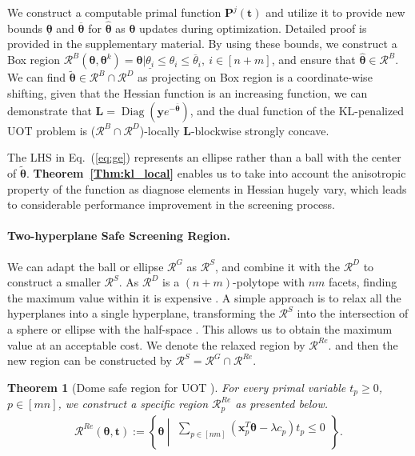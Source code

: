 \documentclass[11pt]{article}
\newtheorem{thm}{Theorem}
\newcommand{\diag}{\operatorname{Diag}}
\newcommand{\mat}[1]{\mathbf{#1}}
\renewcommand{\vec}[1]{\bm{#1}}
\begin{document}
We construct a computable primal function $\mat P^{j}({\vec t})$ and utilize it to provide new bounds $\underline{\vec\theta}$ and $\overline{\vec\theta}$ for $\hat{\vec\theta}$ as $\vec\theta$ updates during optimization. Detailed proof is provided in the supplementary material. By using these bounds, we construct a Box region $\mathcal{R}^{B}(\vec\theta,\vec\theta^{k}) = {\vec\theta | \underline{\theta_i} \leq {\theta}_i \leq \overline{\theta}_i, \ i \in [n+m] }$, and ensure that $\hat{\vec\theta} \in \mathcal{R}^{B}$. We can find $\tilde{\vec\theta} \in \mathcal{R}^{B}\cap \mathcal{R}^{D}$ as projecting on Box region is a coordinate-wise shifting, given that the Hessian function is an increasing function, we can demonstrate that $\mat L = \diag{(\vec y e^{-\overline{\vec\theta}})}$, and the dual function of the KL-penalized UOT problem is ($\mathcal{R}^{B}\cap \mathcal{R}^{D}$)-locally $\mat L$-blockwise strongly concave.


The LHS in Eq.~(\ref{eq:ge}) represents an ellipse rather than a ball with the center of $\tilde{\vec\theta}$. {\bf Theorem~\ref{Thm:kl_local}} enables us to take into account the anisotropic property of the function as diagnose elements in Hessian hugely vary, which leads to considerable performance improvement in the screening process.

\paragraph{Two-hyperplane Safe Screening Region.}
\label{Sec:CTP}

We can adapt the ball or ellipse $\mathcal{R}^{G}$ as $\mathcal{R}^{S}$, and combine it with the $\mathcal{R}^{D}$ to construct a smaller $\mathcal{R}^{S}$. As $\mathcal{R}^{D}$ is a $(n+m)$-polytope with $nm$ facets, finding the maximum value within it is expensive \cite{Wang_JMLR_2015}. A simple approach is to relax all the hyperplanes into a single hyperplane, transforming the $\mathcal{R}^{S}$ into the intersection of a sphere or ellipse with the half-space \cite{DBLP:conf/icassp/XiangR12, DBLP:conf/icml/LiuZWY14, Yamada_NIPS_2021, JMLR:v18:16-577}. This allows us to obtain the maximum value at an acceptable cost. We denote the relaxed region by $\mathcal{R}^{Re}$. and then the new region can be constructed by $\mathcal{R}^{S} = \mathcal{R}^{G} \cap \mathcal{R}^{Re}$.

\begin{thm}[Dome safe region for UOT \citep{Yamada_NIPS_2021}]
\label{Thm:Dome}
For every primal variable $t_p \geq 0$, $p \in [mn]$, we construct a specific region $\mathcal{R}^{Re}_{p}$ as presented below.
\begin{equation}
\label{Eq:FinalDome}
\begin{split}
\mathcal{R}^{Re}(\vec{\theta}, \vec{t}):= \left\{\vec{\theta} \ \left|\
\begin{aligned}
\sum_{p\in [nm]}(\vec{x}_{p}^{T}\vec{\theta} - \lambda {c}_p)t_p\leq 0 \\
\end{aligned}
\right.
\right\}.
\end{split}
\end{equation}
\end{thm}
\end{document}
